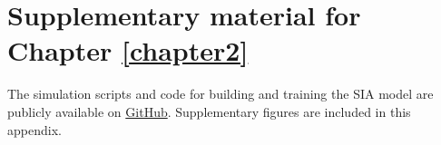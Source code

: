 \chapter{Supplementary material for Chapter \ref{chapter2}} \label{appxA}

The simulation scripts and code for building and training the \ac{SIA} model are publicly available on \href{https://github.com/CshlSiepelLab/arg-selection}{GitHub}. Supplementary figures are included in this appendix.

